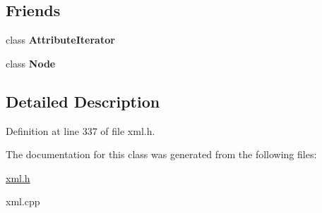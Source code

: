 \subsection*{Friends}
\begin{DoxyCompactItemize}
\item 
\hypertarget{classphys_1_1xml_1_1Attribute_a1ed8790083a80b2604beba1c666bce6e}{
class {\bfseries AttributeIterator}}
\label{da/ddf/classphys_1_1xml_1_1Attribute_a1ed8790083a80b2604beba1c666bce6e}

\item 
\hypertarget{classphys_1_1xml_1_1Attribute_a6db9d28bd448a131448276ee03de1e6d}{
class {\bfseries Node}}
\label{da/ddf/classphys_1_1xml_1_1Attribute_a6db9d28bd448a131448276ee03de1e6d}

\end{DoxyCompactItemize}


\subsection{Detailed Description}


Definition at line 337 of file xml.h.



The documentation for this class was generated from the following files:\begin{DoxyCompactItemize}
\item 
\hyperlink{xml_8h}{xml.h}\item 
xml.cpp\end{DoxyCompactItemize}
